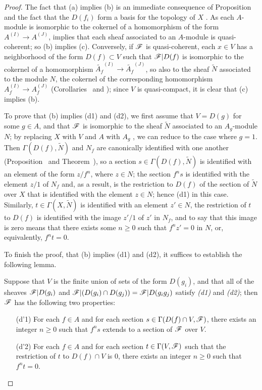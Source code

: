 \begin{proof}
\label{proof-1.1.4.1}
The fact that (a) implies (b) is an immediate consequence of Proposition~ and the fact that the $D(f_i)$ form a basis for the topology of $X$ .
As each $A$-module is isomorphic to the cokernel of a homomorphism of the form $A^{(I)}\to A^{(J)}$,  implies that each sheaf associated to an $A$-module is quasi-coherent;
so (b) implies (c).
Conversely, if $\mathscr{F}$ is quasi-coherent, each $x\in V$ has a neighborhood of the form $D(f)\subset V$ such that $\mathscr{F}|D(f)$ is isomorphic to the cokernel of a homomorphism $\widetilde{A_f}^{(I)}\to\widetilde{A_f}^{(J)}$, so also to the sheaf $\widetilde{N}$ associated to the module $N$, the cokernel of the corresponding homomorphism
$A_f^{(I)}\to A_f^{(J)}$ (Corollaries~ and );
since $V$ is quasi-compact, it is clear that (c) implies (b).

To prove that (b) implies (d1) and (d2), we first assume that $V=D(g)$ for some $g\in A$, and that $\mathscr{F}$ is isomorphic to the sheaf $\widetilde{N}$ associated to an $A_g$-module $N$;
by replacing $X$ with $V$ and $A$ with $A_g$ , we can reduce to the case where $g=1$.
Then $\Gamma(D(f),\widetilde{N})$ and $N_f$ are canonically identified with one another (Proposition~ and Theorem~), so a section $s\in\Gamma(D(f),\widetilde{N})$ is identified with an element of the form $z/f^n$, where $z\in N$;
the section $f^n s$ is identified with the element $z/1$ of $N_f$ and, as a result, is the restriction to $D(f)$ of the section of $\widetilde{N}$ over $X$ that is identified with the element $z\in N$;
hence (d1) in this case.
Similarly, $t\in\Gamma(X,\widetilde{N})$ is identified with an element $z'\in N$, the restriction of $t$ to $D(f)$ is identified with the image $z'/1$ of $z'$ in $N_f$, and to say that this image is zero means that there exists some $n\geq 0$ such that $f^n z'=0$ in $N$, or, equivalently, $f^n t=0$.

To finish the proof, that (b) implies (d1) and (d2), it suffices to establish the following lemma.
\begin{lemma}[1.4.1.1]
\label{1.1.4.1.1}
Suppose that $V$ is the finite union of sets of the form $D(g_i)$, and that all of the sheaves $\mathscr{F}|D(g_i)$ and $\mathscr{F}|(D(g_i)\cap D(g_j))=\mathscr{F}|D(g_i g_j)$ satisfy \emph{(d1)} and \emph{(d2)};
then $\mathscr{F}$ has the following two properties:
\begin{enumerate}
  \item[{\rm(d'1)}] For each $f\in A$ and for each section $s\in\Gamma(D(f)\cap V,\mathscr{F})$, there exists an integer $n\geq 0$ such that $f^n s$ extends to a section of $\mathscr{F}$ over $V$.
  \item[{\rm(d'2)}] For each $f\in A$ and for each section $t\in\Gamma(V,\mathscr{F})$ such that the restriction of $t$ to $D(f)\cap V$ is $0$, there exists an integer $n\geq 0$ such that $f^n t=0$.
\end{enumerate}
\end{lemma}


\end{proof}
